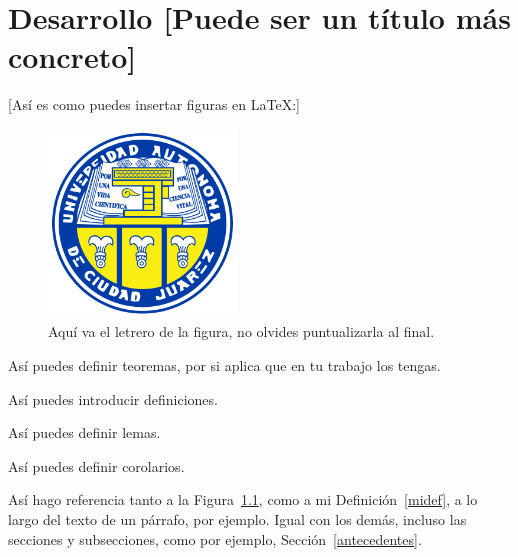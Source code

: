 
\chapter{Desarrollo [Puede ser un título más concreto]}








[Así es como puedes insertar figuras en \LaTeX:]

\begin{figure}[htbp]
	\begin{center}
		\includegraphics[width=5cm,height=50mm]{Escudo-uacj2015-color-sin-fondo.png}
	\end{center}
	\caption{Aquí va el letrero de la figura, no olvides puntualizarla al final.}
	\label{fig:logoblack}
\end{figure}


\begin{theorem}[Mi teorema]
    Así puedes definir teoremas, por si aplica que en tu trabajo los tengas.
\end{theorem}

\begin{definition}[Mi definición]
\label{midef}
    Así puedes introducir definiciones.
\end{definition}

\begin{lemma}[Mi Lema]
    Así puedes definir lemas.
\end{lemma}

\begin{corollary}[Mi corolario]
    Así puedes definir corolarios.
\end{corollary}

Así hago referencia tanto a la Figura~\ref{fig:logoblack}, como a mi Definición~\ref{midef}, a lo largo del texto de un párrafo, por ejemplo. Igual con los demás, incluso las secciones y subsecciones, como por ejemplo, Sección~\ref{antecedentes}.

